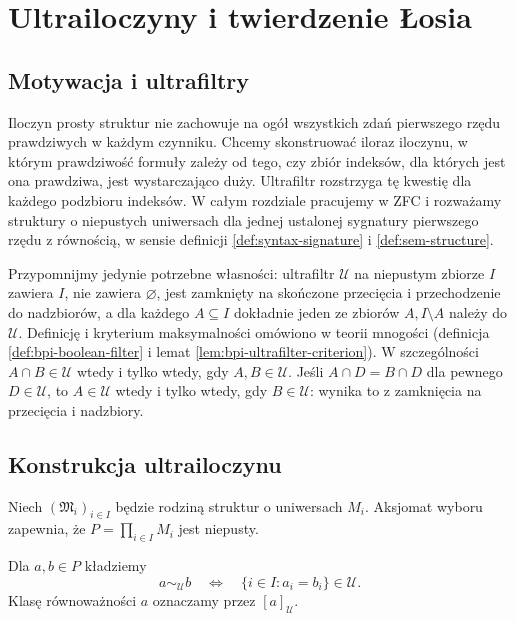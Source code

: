 \chapter{Ultrailoczyny i twierdzenie Łosia}
\label{ch:mod-ultraproducts}

\section{Motywacja i ultrafiltry}
Iloczyn prosty struktur nie zachowuje na ogół wszystkich zdań
pierwszego rzędu prawdziwych w każdym czynniku. Chcemy skonstruować
iloraz iloczynu, w którym prawdziwość formuły zależy od tego, czy
zbiór indeksów, dla których jest ona prawdziwa, jest wystarczająco duży.
Ultrafiltr rozstrzyga tę kwestię dla każdego podzbioru indeksów.
W całym rozdziale pracujemy w ZFC i rozważamy struktury o niepustych
uniwersach dla jednej ustalonej sygnatury pierwszego rzędu z równością,
w sensie definicji \ref{def:syntax-signature} i
\ref{def:sem-structure}.

Przypomnijmy jedynie potrzebne własności: ultrafiltr $\mathcal U$
na niepustym zbiorze $I$ zawiera $I$, nie zawiera $\varnothing$,
jest zamknięty na skończone przecięcia i przechodzenie do nadzbiorów,
a dla każdego $A\subseteq I$ dokładnie jeden ze zbiorów $A,I\setminus A$
należy do $\mathcal U$. Definicję i kryterium maksymalności
omówiono w teorii mnogości (definicja \ref{def:bpi-boolean-filter}
i lemat \ref{lem:bpi-ultrafilter-criterion}).
W szczególności $A\cap B\in\mathcal U$ wtedy i tylko wtedy, gdy
$A,B\in\mathcal U$. Jeśli $A\cap D=B\cap D$ dla pewnego $D\in\mathcal U$,
to $A\in\mathcal U$ wtedy i tylko wtedy, gdy $B\in\mathcal U$:
wynika to z zamknięcia na przecięcia i nadzbiory.

\section{Konstrukcja ultrailoczynu}
\label{sec:mod-ultraproduct-construction}
Niech $(\mathfrak M_i)_{i\in I}$ będzie rodziną struktur o uniwersach
$M_i$. Aksjomat wyboru zapewnia, że $P=\prod_{i\in I}M_i$
jest niepusty.

\begin{definicja}
\label{def:mod-ultra-equivalence}
Dla $a,b\in P$ kładziemy
\[
a\sim_{\mathcal U}b
\quad\Longleftrightarrow\quad
\{i\in I:a_i=b_i\}\in\mathcal U.
\]
Klasę równoważności $a$ oznaczamy przez $[a]_{\mathcal U}$.
\end{definicja}

